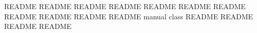 \graphicspath{{./}{chapters/}{quick-tutorial/}{web-ui/}{text-ui/}{experiments/}{tables/}{plots/}{files/}{saving/}{metadata/}{commands/}{builder/}{multiple-machines/}{provenance/}{edit/}{other}}

{README}
{README}                                            
{README}
{README}
{README}
{README}
{README}
{README}
{README}
{README}
{README}
{manual}
{class}
{README}
{README}
{README}
{README}
